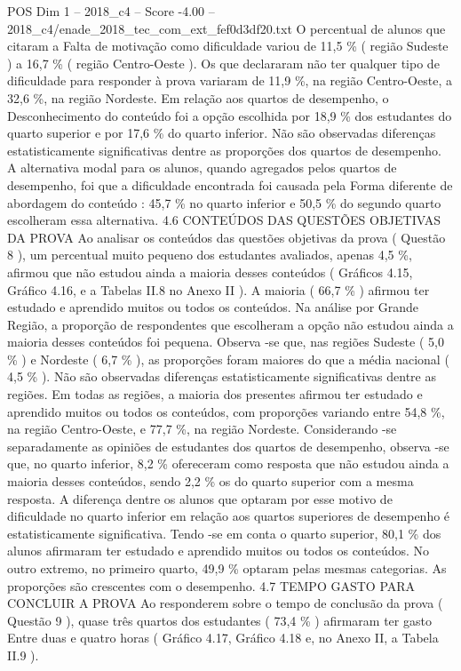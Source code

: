\begin{textsample}{POS Dim 1 – 2018\_c4 – Score -4.00 – 2018\_c4/enade\_2018\_tec\_com\_ext\_fef0d3df20.txt}
O percentual de alunos que citaram a Falta de motivação como dificuldade variou de 11,5 \% ( região Sudeste ) a 16,7 \% ( região Centro-Oeste ).
Os que declararam não ter qualquer tipo de dificuldade para responder à prova variaram de 11,9 \%, na região Centro-Oeste, a 32,6 \%, na região Nordeste.
Em relação aos quartos de desempenho, o Desconhecimento do conteúdo foi a opção escolhida por 18,9 \% dos estudantes do quarto superior e por 17,6 \% do quarto inferior.
Não são observadas diferenças estatisticamente significativas dentre as proporções dos quartos de desempenho.
A alternativa modal para os alunos, quando agregados pelos quartos de desempenho, foi que a dificuldade encontrada foi causada pela Forma diferente de abordagem do conteúdo : 45,7 \% no quarto inferior e 50,5 \% do segundo quarto escolheram essa alternativa. 4.6 CONTEÚDOS DAS QUESTÕES OBJETIVAS DA PROVA Ao analisar os conteúdos das questões objetivas da prova ( Questão 8 ), um percentual muito pequeno dos estudantes avaliados, apenas 4,5 \%, afirmou que não estudou ainda a maioria desses conteúdos ( Gráficos 4.15, Gráfico 4.16, e a Tabelas II.8 no Anexo II ).
A maioria ( 66,7 \% ) afirmou ter estudado e aprendido muitos ou todos os conteúdos.
Na análise por Grande Região, a proporção de respondentes que escolheram a opção não estudou ainda a maioria desses conteúdos foi pequena.
Observa -se que, nas regiões Sudeste ( 5,0 \% ) e Nordeste ( 6,7 \% ), as proporções foram maiores do que a média nacional ( 4,5 \% ).
Não são observadas diferenças estatisticamente significativas dentre as regiões.
Em todas as regiões, a maioria dos presentes afirmou ter estudado e aprendido muitos ou todos os conteúdos, com proporções variando entre 54,8 \%, na região Centro-Oeste, e 77,7 \%, na região Nordeste.
Considerando -se separadamente as opiniões de estudantes dos quartos de desempenho, observa -se que, no quarto inferior, 8,2 \% ofereceram como resposta que não estudou ainda a maioria desses conteúdos, sendo 2,2 \% os do quarto superior com a mesma resposta.
A diferença dentre os alunos que optaram por esse motivo de dificuldade no quarto inferior em relação aos quartos superiores de desempenho é estatisticamente significativa.
Tendo -se em conta o quarto superior, 80,1 \% dos alunos afirmaram ter estudado e aprendido muitos ou todos os conteúdos.
No outro extremo, no primeiro quarto, 49,9 \% optaram pelas mesmas categorias.
As proporções são crescentes com o desempenho. 4.7 TEMPO GASTO PARA CONCLUIR A PROVA Ao responderem sobre o tempo de conclusão da prova ( Questão 9 ), quase três quartos dos estudantes ( 73,4 \% ) afirmaram ter gasto Entre duas e quatro horas ( Gráfico 4.17, Gráfico 4.18 e, no Anexo II, a Tabela II.9 ).

\end{textsample}
